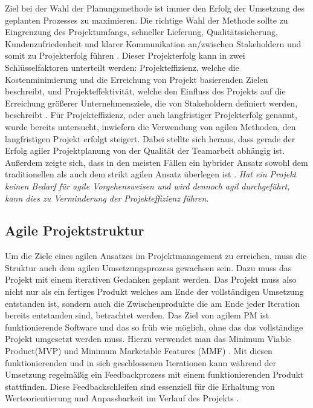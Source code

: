 Ziel bei der Wahl der Planungsmethode ist immer den Erfolg der Umsetzung des geplanten Prozesses zu maximieren.
Die richtige Wahl der Methode sollte zu Eingrenzung des Projektumfangs, schneller Lieferung, Qualitätssicherung, Kundenzufriedenheit und klarer Kommunikation an/zwischen Stakeholdern und somit zu Projekterfolg führen \cite{systemsApproachToPlanningSchedulingAndControlling}.
Dieser Projekterfolg kann in zwei Schlüsselfaktoren unterteilt werden: Projekteffizienz, welche die Kostenminimierung und die Erreichung von Projekt basierenden Zielen beschreibt, und Projekteffektivität, welche den Einfluss des Projekts auf die Erreichung größerer Unternehmensziele, die von Stakeholdern definiert werden, beschreibt \cite{relationshipBetweenProjectSuccessAndProjectEfficiency}.
Für Projekteffizienz, oder auch langfristiger Projekterfolg genannt, wurde bereits untersucht, inwiefern die Verwendung von agilen Methoden, den langfristigen Projekt erfolgt steigert. Dabei stellte sich heraus, dass gerade der Erfolg agiler Projektplanung von der Qualität der Teamarbeit abhängig ist.
Außerdem zeigte sich, dass in den meisten Fällen ein hybrider Ansatz sowohl dem traditionellen als auch dem strikt agilen Ansatz überlegen ist \cite{traditionalAndAgileOnProjectSuccess}.
\emph{Hat ein Projekt keinen Bedarf für agile Vorgehensweisen und wird dennoch agil durchgeführt, kann dies zu Verminderung der Projekteffizienz führen}.

\subsection{Agile Projektstruktur}
Um die Ziele eines agilen Ansatzes im Projektmanagement zu erreichen, muss die Struktur auch dem agilen Umsetzungsprozess gewachsen sein. Dazu muss das Projekt mit einem iterativen Gedanken geplant werden. Das Projekt muss also nicht nur als ein fertiges Produkt welches am Ende der vollständigen Umsetzung entstanden ist, sondern auch die Zwischenprodukte die am Ende jeder Iteration bereits entstanden sind, betrachtet werden. Das Ziel von agilem PM ist funktionierende Software und das so früh wie möglich, ohne das das vollständige Projekt umgesetzt werden muss. Hierzu verwendet man das Minimum Viable Product(MVP) und Minimum Marketable Features (MMF) \cite{agilesProjektmanagementImBerufsalltagMVPundMMF}.  Mit diesen funktionierenden und in sich geschlossenen Iterationen kann während der Umsetzung regelmäßig ein Feedbackprozess mit einem funktionierenden Produkt stattfinden. Diese Feedbackschleifen sind essenziell für die Erhaltung von Werteorientierung und Anpassbarkeit im Verlauf des Projekts \cite{}.

